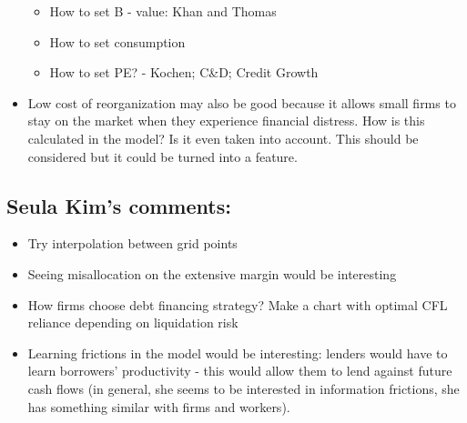 \documentclass[12pt]{article}
\begin{document}
\begin{itemize}
    \begin{itemize}\setlength\itemsep{0em} 
        \item How to set B - value: Khan and Thomas 
        \item How to set consumption
        \item How to set PE? - Kochen; C\&D; Credit Growth
    \end{itemize}
    \item Low cost of reorganization may also be good because it allows small firms to stay on the market when they experience financial distress. How is this calculated in the model? Is it even taken into account. This should be considered but it could be turned into a feature. 
\end{itemize} \normalsize

\subsection*{Seula Kim's comments:} 
\begin{itemize} \setlength\itemsep{0em} \small
    \item Try interpolation between grid points 
    \item Seeing misallocation on the extensive margin would be interesting
    \item How firms choose debt financing strategy? Make a chart with optimal CFL reliance depending on liquidation risk
    \item Learning frictions in the model would be interesting: lenders would have to learn borrowers' productivity - this would allow them to lend against future cash flows (in general, she seems to be interested in information frictions, she has something similar with firms and workers). 
\end{itemize} \normalsize 
\end{document}
